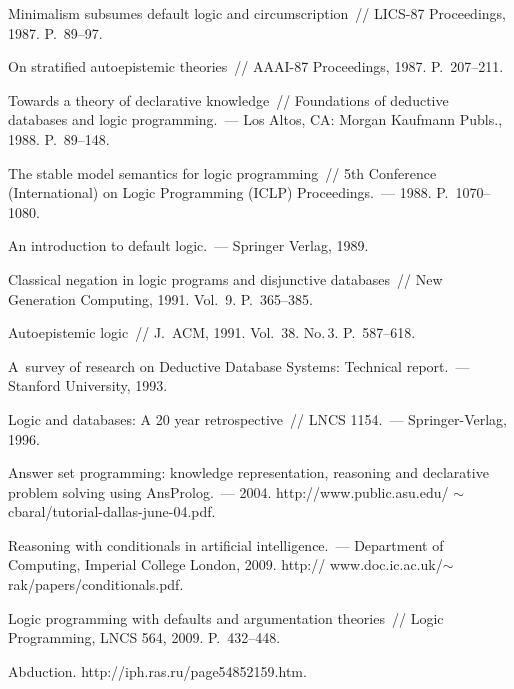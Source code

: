 \begin{multicols}{2}
{{\begin{thebibliography}{99}
Minimalism subsumes default logic and circumscription~// LICS-87 Proceedings, 1987. P.~89--97.

 On stratified autoepistemic theories~// AAAI-87 Proceedings, 1987. P.~207--211.

Towards a theory of declarative knowledge~// Foundations of deductive databases and logic programming.~--- 
Los Altos, CA: Morgan Kaufmann Publs., 1988. P.~89--148.

The stable model semantics for logic programming~// 5th Conference (International) on Logic Programming 
(ICLP) Proceedings.~--- 1988. P.~1070--1080.

 An introduction to default logic.~--- Springer Verlag, 1989. 

Classical negation in logic programs and disjunctive databases~// New Generation Computing, 1991. Vol.~9. 
P.~365--385.

Autoepistemic logic~// J.~ACM, 1991. Vol.~38. No.\,3. P.~587--618.

A~survey of research on Deductive Database Systems: Technical report.~--- Stanford University, 1993.

 Logic and databases: A 20 year retrospective~// LNCS 1154.~--- Springer-Verlag, 1996.

Answer set programming: knowledge representation, reasoning and declarative problem solving using 
AnsProlog.~--- 2004. {\sf http://www.public.asu.edu/ $\sim$cbaral/tutorial-dallas-june-04.pdf}.


Reasoning with conditionals in artificial intelligence.~--- Department of Computing, Imperial College London, 
2009. {\sf http:// www.doc.ic.ac.uk/$\sim$rak/papers/conditionals.pdf}. 

Logic programming with defaults and argumentation theories~// Logic Programming, LNCS 564, 2009. 
P.~432--448.

Abduction. {\sf http://iph.ras.ru/page54852159.htm}.




\end{thebibliography}}}
\end{multicols}
